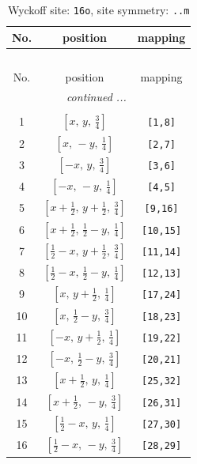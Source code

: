 \documentclass[fleqn,8pt]{jsarticle}
\begin{document}
\renewcommand{\arraystretch}{1.2}
\begin{longtable}{ccc}
\caption{Wyckoff site: {\tt 16o}, site symmetry: {\tt ..m}}
 \\
 \hline \hline
No. & position & mapping \\ \hline \endfirsthead

\multicolumn{2}{l}{\tablename\ \thetable{}} \\
 \hline \hline
No. & position & mapping \\ \hline \endhead

 \hline \hline
\multicolumn{2}{r}{\footnotesize\it continued ...} \\ \endfoot

 \hline \hline
\multicolumn{2}{r}{} \\ \endlastfoot

1 & $\left[ x,\, y,\, \frac{3}{4} \right]$ & {\tt [1,8]} \\ \hline
2 & $\left[ x,\, - y,\, \frac{1}{4} \right]$ & {\tt [2,7]} \\ \hline
3 & $\left[ - x,\, y,\, \frac{3}{4} \right]$ & {\tt [3,6]} \\ \hline
4 & $\left[ - x,\, - y,\, \frac{1}{4} \right]$ & {\tt [4,5]} \\ \hline
5 & $\left[ x + \frac{1}{2},\, y + \frac{1}{2},\, \frac{3}{4} \right]$ & {\tt [9,16]} \\ \hline
6 & $\left[ x + \frac{1}{2},\, \frac{1}{2} - y,\, \frac{1}{4} \right]$ & {\tt [10,15]} \\ \hline
7 & $\left[ \frac{1}{2} - x,\, y + \frac{1}{2},\, \frac{3}{4} \right]$ & {\tt [11,14]} \\ \hline
8 & $\left[ \frac{1}{2} - x,\, \frac{1}{2} - y,\, \frac{1}{4} \right]$ & {\tt [12,13]} \\ \hline
9 & $\left[ x,\, y + \frac{1}{2},\, \frac{1}{4} \right]$ & {\tt [17,24]} \\ \hline
10 & $\left[ x,\, \frac{1}{2} - y,\, \frac{3}{4} \right]$ & {\tt [18,23]} \\ \hline
11 & $\left[ - x,\, y + \frac{1}{2},\, \frac{1}{4} \right]$ & {\tt [19,22]} \\ \hline
12 & $\left[ - x,\, \frac{1}{2} - y,\, \frac{3}{4} \right]$ & {\tt [20,21]} \\ \hline
13 & $\left[ x + \frac{1}{2},\, y,\, \frac{1}{4} \right]$ & {\tt [25,32]} \\ \hline
14 & $\left[ x + \frac{1}{2},\, - y,\, \frac{3}{4} \right]$ & {\tt [26,31]} \\ \hline
15 & $\left[ \frac{1}{2} - x,\, y,\, \frac{1}{4} \right]$ & {\tt [27,30]} \\ \hline
16 & $\left[ \frac{1}{2} - x,\, - y,\, \frac{3}{4} \right]$ & {\tt [28,29]} \\
\end{longtable}
\end{document}

